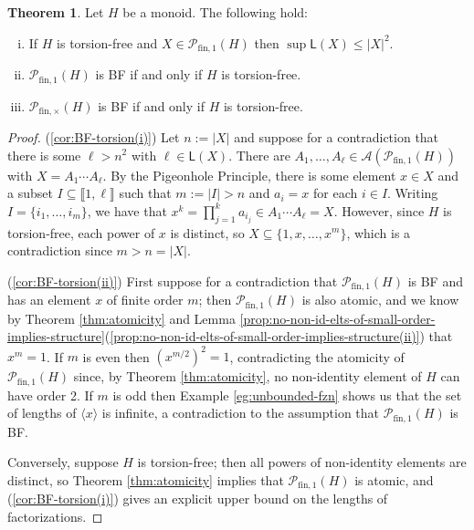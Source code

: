 \documentclass{report}
\renewcommand{\P}{\mathcal{P}}
\newcommand{\gen}[1]{\langle #1 \rangle}
\newcommand{\llb}{\llbracket}
\newcommand{\rrb}{\rrbracket}
\newcommand{\funt}{{\textrm{fin}, \times}}
\newcommand{\fun}{{\textrm{fin}, 1}}
\renewcommand{\:}{\text{:}}
\theoremstyle{definition}
\newtheorem{thm}[defn]{Theorem}
\begin{document}
\begin{thm}\label{cor:BF-torsion}
Let $H$ be a monoid. The following hold:
\begin{enumerate}[(i)]
\item\label{cor:BF-torsion(i)} If $H$ is torsion-free and $X\in \P_\fun(H)$ then $\sup \mathsf{L}(X) \le |X|^2$.
\item\label{cor:BF-torsion(ii)} $\P_\fun(H)$ is \textup{BF} if and only if $H$ is torsion-free.
\item\label{cor:BF-torsion(iii)} $\P_\funt(H)$ is \textup{BF} if and only if $H$ is torsion-free.
\end{enumerate}
\end{thm}
\begin{proof}
(\ref{cor:BF-torsion(i)})
Let $n := |X|$ and suppose for a contradiction that there is some $\ell>n^2$ with $\ell\in \mathsf{L}(X)$.
There are $A_1,\dots, A_\ell\in \mathscr{A}(\P_\fun(H))$ with $X = A_1\cdots A_\ell$.
By the Pigeonhole Principle, there is some element $x\in X$ and a subset $I \subseteq \llb 1,\ell \rrb$ such that $m := |I|>n$ and $a_i = x$ for each $i\in I$.
Writing $I = \{i_1,\ldots, i_m\}$, we have that $x^k = \prod_{j=1}^k a_{i_j} \in A_1\cdots A_\ell = X$.
However, since $H$ is torsion-free, each power of $x$ is distinct, so $X \subseteq \{1,x,\dots, x^m\}$, which is a contradiction since $m > n = |X|$.

(\ref{cor:BF-torsion(ii)})
First suppose for a contradiction that $\P_\fun(H)$ is BF and has an element $x$ of finite order $m$; then $\P_\fun(H)$ is also atomic, and we know by Theorem \ref{thm:atomicity} and Lemma \ref{prop:no-non-id-elts-of-small-order-implies-structure}(\ref{prop:no-non-id-elts-of-small-order-implies-structure(ii)}) that $x^m=1$.
If $m$ is even then $(x^{m/2})^2=1$, contradicting the atomicity of $\P_\fun(H)$ since, by Theorem \ref{thm:atomicity}, no non-identity element of $H$ can have order 2. 
If $m$ is odd then Example \ref{eg:unbounded-fzn} shows us that the set of lengths of $\gen{x}$ is infinite, a contradiction to the assumption that $\P_\fun(H)$ is BF.

Conversely, suppose $H$ is torsion-free; then all powers of non-identity elements are distinct, so Theorem \ref{thm:atomicity} implies that $\P_\fun(H)$ is atomic, and (\ref{cor:BF-torsion(i)}) gives an explicit upper bound on the lengths of factorizations.


\end{proof}
\end{document}
